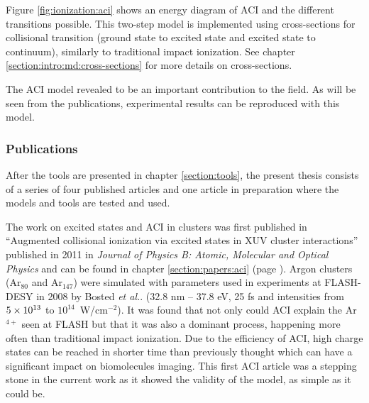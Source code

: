 Figure \ref{fig:ionization:aci} shows an energy diagram of ACI and the
different transitions possible. This two-step model is implemented using
cross-sections for collisional transition (ground state to excited state and
excited state to continuum), similarly to traditional impact
ionization. See chapter \ref{section:intro:md:cross-sections} for more
details on cross-sections.

The ACI model revealed to be an important contribution to the field. As will be
seen from the publications, experimental results can be reproduced with this
model.



\subsubsection{Publications}

After the tools are presented in chapter \ref{section:tools}, the present thesis
consists of a series of four published articles and one article in preparation
where the models and tools are tested and used.



The work on excited states and ACI in clusters was first published in
``Augmented collisional ionization via excited states in XUV cluster
interactions'' published in 2011 in \textit{Journal of Physics B: Atomic,
Molecular and Optical Physics}\cite{Ackad2011a} and can be found in chapter
\ref{section:papers:aci} (page \pageref{section:papers:aci}). Argon clusters
(Ar$_{80}$ and Ar$_{147}$) were simulated with parameters used in experiments
at FLASH-DESY in 2008 by Bosted \textit{et al.}\cite{Bostedt2008}.
(32.8 nm -- 37.8 eV, 25 fs and intensities from $\ten{5}{13}$ to
$10^{14}$~W/cm$^{-2}$). It was found that not only could ACI explain the
Ar$^{4+}$ seen at FLASH but that it
was also a dominant process, happening more often than traditional impact ionization.
Due to the efficiency of ACI, high charge states can be reached in shorter time
than previously thought which can have a significant impact on biomolecules
imaging. This first ACI article was a stepping stone in the current work as it
showed the validity of the model, as simple as it could be.



